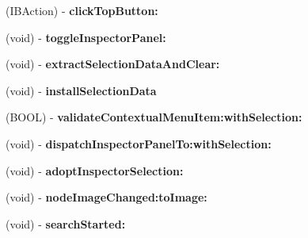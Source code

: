 \begin{DoxyCompactItemize}
\item 
\hypertarget{interface_p_a_d_inspector_controller_addd2ec89cc8339164556a101970a3837}{
(IBAction) -\/ {\bfseries clickTopButton:}}
\label{interface_p_a_d_inspector_controller_addd2ec89cc8339164556a101970a3837}

\item 
\hypertarget{interface_p_a_d_inspector_controller_add0f41dd2eb8a151ebcca64bb72fc262}{
(void) -\/ {\bfseries toggleInspectorPanel:}}
\label{interface_p_a_d_inspector_controller_add0f41dd2eb8a151ebcca64bb72fc262}

\item 
\hypertarget{interface_p_a_d_inspector_controller_ab26c692f62b477e5a3a21ad282d783ee}{
(void) -\/ {\bfseries extractSelectionDataAndClear:}}
\label{interface_p_a_d_inspector_controller_ab26c692f62b477e5a3a21ad282d783ee}

\item 
\hypertarget{interface_p_a_d_inspector_controller_af683dd61b742d38abe6b870ff28582bd}{
(void) -\/ {\bfseries installSelectionData}}
\label{interface_p_a_d_inspector_controller_af683dd61b742d38abe6b870ff28582bd}

\item 
\hypertarget{interface_p_a_d_inspector_controller_a4276c575da4790e0c3d74f2e18ac105c}{
(BOOL) -\/ {\bfseries validateContextualMenuItem:withSelection:}}
\label{interface_p_a_d_inspector_controller_a4276c575da4790e0c3d74f2e18ac105c}

\item 
\hypertarget{interface_p_a_d_inspector_controller_a1ec6b715453162805006e31586d739ae}{
(void) -\/ {\bfseries dispatchInspectorPanelTo:withSelection:}}
\label{interface_p_a_d_inspector_controller_a1ec6b715453162805006e31586d739ae}

\item 
\hypertarget{interface_p_a_d_inspector_controller_aefb805dce58c2471896310edef675187}{
(void) -\/ {\bfseries adoptInspectorSelection:}}
\label{interface_p_a_d_inspector_controller_aefb805dce58c2471896310edef675187}

\item 
\hypertarget{interface_p_a_d_inspector_controller_a0c0593f8e608d0a84fe593c29d19b875}{
(void) -\/ {\bfseries nodeImageChanged:toImage:}}
\label{interface_p_a_d_inspector_controller_a0c0593f8e608d0a84fe593c29d19b875}

\item 
\hypertarget{interface_p_a_d_inspector_controller_a1aab079f9e44c5afecd552c7077fc190}{
(void) -\/ {\bfseries searchStarted:}}
\label{interface_p_a_d_inspector_controller_a1aab079f9e44c5afecd552c7077fc190}


\end{DoxyCompactItemize}
